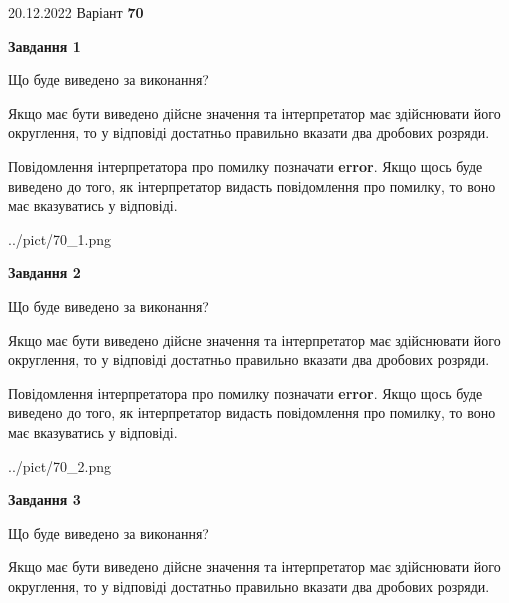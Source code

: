 \documentclass[12pt, ukrainian]{article}
\begin{document}
{20.12.2022 Варіант \No \textbf { 70 }\par}
{
\begin {Large}

{\begin {center}\textbf{Завдання 1}\end {center}}\par
Що буде виведено за виконання? \par

Якщо має бути виведено дійсне значення та інтерпретатор має здійснювати його округлення, 
то у відповіді достатньо правильно вказати два дробових розряди.

Повідомлення інтерпретатора про помилку позначати \textbf{error}.
Якщо щось буде виведено до того, як інтерпретатор видасть повідомлення про помилку, 
то воно має вказуватись у відповіді. \par

\begin{center}
	{../pict/70_1.png}
\end{center}
\newpage

{\begin {center}\textbf{Завдання 2}\end {center}}\par
Що буде виведено за виконання? \par

Якщо має бути виведено дійсне значення та інтерпретатор має здійснювати його округлення, 
то у відповіді достатньо правильно вказати два дробових розряди.

Повідомлення інтерпретатора про помилку позначати \textbf{error}.
Якщо щось буде виведено до того, як інтерпретатор видасть повідомлення про помилку, 
то воно має вказуватись у відповіді. \par

\begin{center}
	{../pict/70_2.png}
\end{center}
\newpage

{\begin {center}\textbf{Завдання 3}\end {center}}\par
Що буде виведено за виконання? \par

Якщо має бути виведено дійсне значення та інтерпретатор має здійснювати його округлення, 
то у відповіді достатньо правильно вказати два дробових розряди.


\end{Large}}
\end{document}
